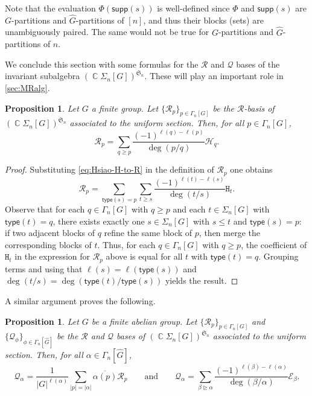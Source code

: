 \documentclass[11pt, oneside, reqno]{amsart}
\newtheorem{prop}[theorem]{Proposition}
\theoremstyle{definition}
\numberwithin{equation}{section}
\DeclareMathOperator{\C}{\mathbb{C}}
\def \kk{\C}
\def \ol{\overline}
\def \sym{\mathfrak{S}}
\def \wh{\widehat}
\def \gsetcomposition{{\Sigma_n[G]}}
\def \hsiao {{\gsetcomposition}}
\DeclareMathOperator{\chgeq}{\unrhd}
\def\qqand{\qquad\text{and}\qquad}
\def \supp{\mathsf{supp}}
\def \type{\mathsf{type}}
\newcommand{\B}[1]{\mathtt{#1}} 			%
\newcommand{\SB}[1]{\mathcal{#1}} 		%
\newcommand{\abs}[1]{|{#1}|} 				%
\begin{document}
Note that the evaluation $\Phi(\supp(s))$ is well-defined since $\Phi$ and $\supp(s)$ are $G$-partitions and $\wh{G}$-partitions of $[n]$, and thus their blocks (sets) are unambiguously paired. The same would not be true for $G$-partitions and $\wh{G}$-partitions of $n$.

We conclude this section with some formulas for the $\SB{R}$ and $\SB{Q}$ bases of the invariant subalgebra $(\kk\hsiao)^{\sym_n}$.
These will play an important role in \cref{sec:MRalg}.

\begin{prop}\label{p:SH-to-SR}
    Let $G$ a finite group. Let $\{\SB{R}_p\}_{p \in \Gamma_n[G]}$ be the $\SB{R}$-basis of $(\kk\hsiao)^{\sym_n}$ associated to the uniform section.
    Then, for all $p \in \Gamma_n[G]$,
    \begin{equation}\label{SH-to-SR}
        \SB{R}_p = \sum_{q \geq p} \dfrac{(-1)^{\ell(q)-\ell(p)}}{\deg(p/q)} \SB{H}_q.
    \end{equation}
\end{prop}

\begin{proof}
    Substituting \cref{eq:Hsiao-H-to-R} in the definition of $\SB{R}_p$ one obtains
    \[
        \SB{R}_p = \sum_{\type(s) = p} \sum_{t \geq s} \dfrac{(-1)^{\ell(t)-\ell(s)}}{\deg(t/s)} \B{H}_t.
    \]
    Observe that for each $q \in \Gamma_n[G]$ with $q \geq p$ and each $t \in \hsiao$ with $\type(t) = q$, there exists exactly one $s \in \hsiao$ with $s \leq t$ and $\type(s) = p$: if
    two adjacent blocks of $q$ refine the same block of $p$, then merge the corresponding blocks of $t$. Thus, for each $q \in \Gamma_n[G]$ with $q \geq p$, the coefficient of $\B{H}_t$ in the expression for $\SB{R}_p$ above is equal for all $t$ with $\type(t) = q$.
    Grouping terms and using that $\ell(s) = \ell(\type(s))$ and $\deg(t/s) = \deg(\type(t)/\type(s))$ yields the result.
\end{proof}

A similar argument proves the following.

\begin{prop}\label{p:SR-to-SQ}
    Let $G$ be a finite abelian group. Let $\{\SB{R}_p\}_{p \in \Gamma_n[G]}$ and $\{\SB{Q}_\phi\}_{\phi \in \Gamma_n[\wh{G}]}$ be the $\SB{R}$ and $\SB{Q}$ bases of $(\kk\hsiao)^{\sym_n}$ associated to the uniform section.
    Then, for all $\alpha \in \Gamma_n[\wh{G}]$,
    \begin{equation}\label{eq:HsiaoSymQbasis}
        \SB{Q}_\alpha =
    \dfrac{1}{|G|^{\ell(\alpha)}} \sum_{\abs{p} = \abs{\alpha}} \ol{\alpha(p)} \SB{R}_p
    \qqand
        \SB{Q}_\alpha = \sum_{\beta \chgeq \alpha} \dfrac{(-1)^{\ell(\beta) - \ell(\alpha)}}{\deg(\beta/\alpha)} \SB{E}_\beta.
    \end{equation}
\end{prop}
\end{document}
